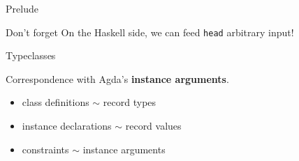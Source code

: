 \documentclass[aspectratio=169]{beamer}
\newcommand\hs[1]{\texttt{#1}}
\newcommand\resetVars{
  \def\sourceRatio{.5}
  \def\zoom{1}
  \def\hsFontsize{\normalsize}
  \def\midruleL{-1cm}
  \def\midruleR{.5cm}
  \def\sourceIcon{agda}
}
\begin{document}
\begin{frame}[fragile]{Prelude}
\pause

\begin{alertblock}{Don't forget}
On the Haskell side, we can feed \hs{head} arbitrary input!
\end{alertblock}
\resetVars
\end{frame}

\begin{frame}[fragile]{Typeclasses}

Correspondence with Agda's \textbf{instance arguments}.
\begin{itemize}
\item class definitions $\sim$ record types
\item instance declarations $\sim$ record values
\item constraints $\sim$ instance arguments
\end{itemize}

\end{frame}
\end{document}
